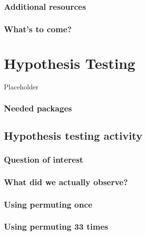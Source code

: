 \documentclass[12pt, krantz2,]{krantz}
\begin{document}
\hypertarget{additional-resources-6}{%
\subsection{Additional resources}\label{additional-resources-6}}

\hypertarget{whats-to-come-7}{%
\subsection{What's to come?}\label{whats-to-come-7}}

\hypertarget{hypothesis-testing}{%
\chapter{Hypothesis Testing}\label{hypothesis-testing}}

Placeholder

\hypertarget{needed-packages-7}{%
\subsection*{Needed packages}\label{needed-packages-7}}


\hypertarget{ht-activity}{%
\section{Hypothesis testing activity}\label{ht-activity}}

\hypertarget{question-of-interest}{%
\subsection{Question of interest}\label{question-of-interest}}

\hypertarget{what-did-we-actually-observe}{%
\subsection{What did we actually observe?}\label{what-did-we-actually-observe}}

\hypertarget{using-permuting-once}{%
\subsection{Using permuting once}\label{using-permuting-once}}

\hypertarget{using-permuting-33-times}{%
\subsection{Using permuting 33 times}\label{using-permuting-33-times}}
\end{document}
